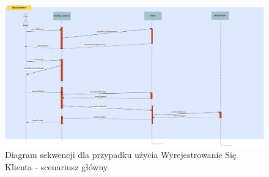   
  
  \begin{figure}[H]
    \includegraphics[width=\textwidth,
    height=0.5\textheight]{graphics/UseCase/Klient/WyrejestrowanieSieKlientaSD.png}
    \caption{Diagram sekwencji dla przypadku użycia Wyrejestrowanie Się Klienta
    - scenariusz główny}
\end{figure}
  
  
 